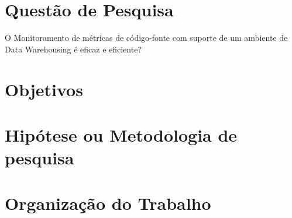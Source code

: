 \section{Questão de Pesquisa}

O Monitoramento de métricas de código-fonte com suporte de um ambiente de Data Warehousing é eficaz e eficiente?

\section{Objetivos}

\section{Hipótese ou Metodologia de pesquisa}

\section{Organização do Trabalho}
